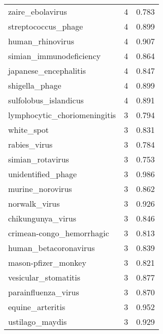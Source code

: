 \begin{tabular}{lrr}
                         zaire\_ebolavirus &                   4 &     0.783 \\
                      streptococcus\_phage &                   4 &     0.899 \\
                         human\_rhinovirus &                   4 &     0.907 \\
                  simian\_immunodeficiency &                   4 &     0.864 \\
                    japanese\_encephalitis &                   4 &     0.847 \\
                           shigella\_phage &                   4 &     0.899 \\
                    sulfolobus\_islandicus &                   4 &     0.891 \\
             lymphocytic\_choriomeningitis &                   3 &     0.794 \\
                               white\_spot &                   3 &     0.831 \\
                             rabies\_virus &                   3 &     0.784 \\
                         simian\_rotavirus &                   3 &     0.753 \\
                       unidentified\_phage &                   3 &     0.986 \\
                         murine\_norovirus &                   3 &     0.862 \\
                            norwalk\_virus &                   3 &     0.926 \\
                        chikungunya\_virus &                   3 &     0.846 \\
                crimean-congo\_hemorrhagic &                   3 &     0.813 \\
                    human\_betacoronavirus &                   3 &     0.839 \\
                      mason-pfizer\_monkey &                   3 &     0.821 \\
                     vesicular\_stomatitis &                   3 &     0.877 \\
                      parainfluenza\_virus &                   3 &     0.870 \\
                         equine\_arteritis &                   3 &     0.952 \\
                          ustilago\_maydis &                   3 &     0.929 \\

\end{tabular}
